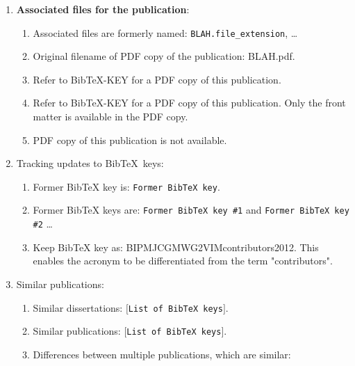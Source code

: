 \documentclass[letter,12pt]{article}
\begin{document}
\begin{enumerate}
\begin{enumerate}
	\item Original French series: BLAH.
	\item Deprecated templates: \vspace{-0.2cm}
		\begin{enumerate} \itemsep -2pt
		\item English translation of title: BLAH.
		\end{enumerate}
	\end{enumerate}
\item {\bf Associated files for the publication}: \vspace{-0.3cm}
	\begin{enumerate} \itemsep -2pt
	\item Associated files are formerly named: {\tt BLAH.file\_extension}, \dots
	\item Original filename of PDF copy of the publication: BLAH.pdf.
	\item Refer to BibTeX-KEY for a PDF copy of this publication.
	\item Refer to BibTeX-KEY for a PDF copy of this publication. Only the front matter is available in the PDF copy.
	\item PDF copy of this publication is not available.
	\end{enumerate}
\item Tracking updates to {\sc Bib}\TeX\ keys: \vspace{-0.3cm}
	\begin{enumerate} \itemsep -2pt
	\item Former BibTeX key is: {\tt Former BibTeX key}.
	\item Former BibTeX keys are: {\tt Former BibTeX key \#1} and {\tt Former BibTeX key \#2} \dots
	\item Keep BibTeX key as: BIPMJCGMWG2VIMcontributors2012. This enables the acronym to be differentiated from the term "contributors".
	\end{enumerate}
\item Similar publications: \vspace{-0.3cm}
	\begin{enumerate} \itemsep -2pt
	\item Similar dissertations: $[${\tt List of {\rm {\sc Bib}\TeX}\ keys}$]$.
	\item Similar publications: $[${\tt List of {\rm {\sc Bib}\TeX}\ keys}$]$.
	\item Differences between multiple publications, which are similar: \vspace{-0.2cm}

\end{enumerate}
\end{enumerate}
\end{document}
